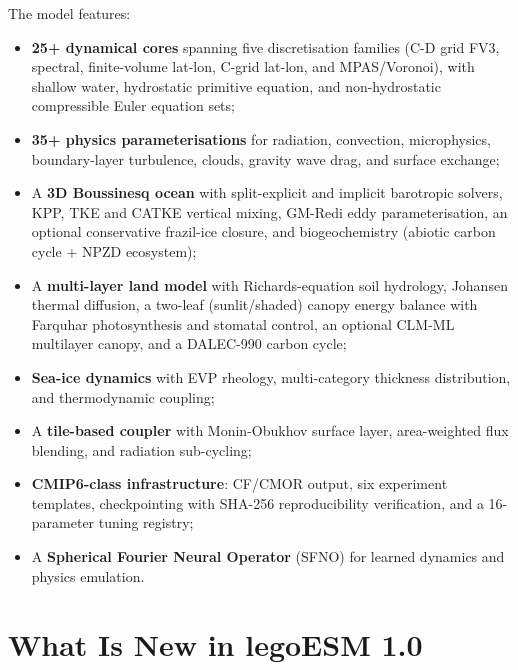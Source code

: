 \documentclass[11pt,twoside]{report}
\begin{document}
The model features:
\begin{itemize}[nosep]
  \item \textbf{25+ dynamical cores} spanning five discretisation families
    (C-D grid FV3, spectral, finite-volume lat-lon, C-grid lat-lon, and
    MPAS/Voronoi), with shallow water, hydrostatic primitive equation,
    and non-hydrostatic compressible Euler equation sets;
  \item \textbf{35+ physics parameterisations} for radiation, convection,
    microphysics, boundary-layer turbulence, clouds, gravity wave drag,
    and surface exchange;
  \item A \textbf{3D Boussinesq ocean} with split-explicit and implicit
    barotropic solvers, KPP, TKE and CATKE vertical mixing, GM-Redi eddy
    parameterisation, an optional conservative frazil-ice closure, and
    biogeochemistry (abiotic carbon cycle + NPZD ecosystem);
  \item A \textbf{multi-layer land model} with Richards-equation
    soil hydrology, Johansen thermal diffusion, a two-leaf (sunlit/shaded)
    canopy energy balance with Farquhar photosynthesis and stomatal
    control, an optional CLM-ML multilayer canopy, and a DALEC-990 carbon
    cycle;
  \item \textbf{Sea-ice dynamics} with EVP rheology, multi-category
    thickness distribution, and thermodynamic coupling;
  \item A \textbf{tile-based coupler} with Monin-Obukhov surface layer,
    area-weighted flux blending, and radiation sub-cycling;
  \item \textbf{CMIP6-class infrastructure}: CF/CMOR output, six
    experiment templates, checkpointing with SHA-256 reproducibility
    verification, and a 16-parameter tuning registry;
  \item A \textbf{Spherical Fourier Neural Operator} (SFNO) for
    learned dynamics and physics emulation.
\end{itemize}

\section{What Is New in legoESM 1.0}
\label{sec:whats-new}
\end{document}
